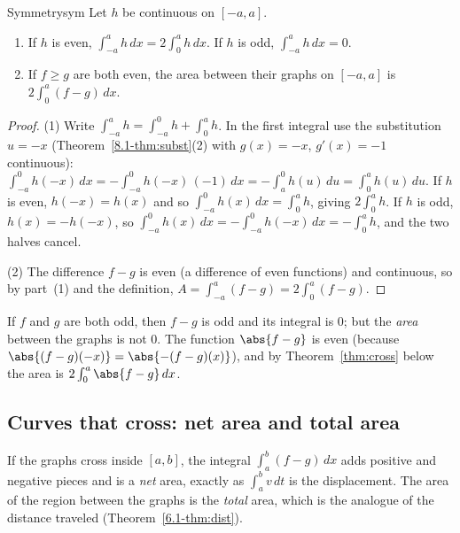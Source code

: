 \documentclass[11pt]{article}
\begin{document}
\begin{thm}{Symmetry}{sym}
Let $h$ be continuous on $[-a,a]$.
\begin{enumerate}[label=(\arabic*),nosep]
  \item If $h$ is even, $\int_{-a}^ah\,dx=2\int_0^ah\,dx$. If $h$ is odd, $\int_{-a}^ah\,dx=0$.
  \item If $f\ge g$ are both even, the area between their graphs on $[-a,a]$ is $2\int_0^a(f-g)\,dx$.
\end{enumerate}
\end{thm}
\begin{proof}
(1) Write $\int_{-a}^ah=\int_{-a}^0h+\int_0^ah$. In the first integral use the substitution $u=-x$ (Theorem~\ref{8.1-thm:subst}(2) with $g(x)=-x$, $g'(x)=-1$ continuous): $\int_{-a}^0h(-x)\,dx=-\int_{-a}^0h(-x)\,(-1)\,dx=-\int_{a}^{0}h(u)\,du=\int_0^ah(u)\,du$. If $h$ is even, $h(-x)=h(x)$ and so $\int_{-a}^0h(x)\,dx=\int_0^ah$, giving $2\int_0^ah$. If $h$ is odd, $h(x)=-h(-x)$, so $\int_{-a}^0h(x)\,dx=-\int_{-a}^0h(-x)\,dx=-\int_0^ah$, and the two halves cancel.

(2) The difference $f-g$ is even (a difference of even functions) and continuous, so by part~(1) and the definition, $A=\int_{-a}^a(f-g)=2\int_0^a(f-g)$.
\end{proof}

\begin{remark}
If $f$ and $g$ are both odd, then $f-g$ is odd and its integral is $0$; but the \emph{area} between the graphs is not $0$. The function $\abs{f-g}$ is even (because $\abs{(f-g)(-x)}=\abs{-(f-g)(x)}$), and by Theorem~\ref{thm:cross} below the area is $2\int_0^a\abs{f-g}\,dx$.
\end{remark}

\subsection*{Curves that cross: net area and total area}

If the graphs cross inside $[a,b]$, the integral $\int_a^b(f-g)\,dx$ adds positive and negative pieces and is a \emph{net} area, exactly as $\int_a^bv\,dt$ is the displacement. The area of the region between the graphs is the \emph{total} area, which is the analogue of the distance traveled (Theorem~\ref{6.1-thm:dist}).
\end{document}
